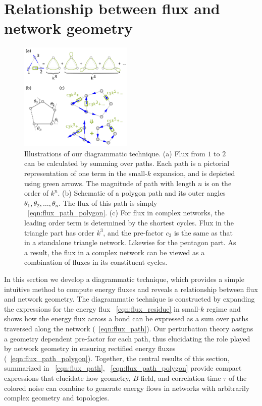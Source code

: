 \documentclass[
 preprint,
 preprintnumbers,
 amsmath,amssymb,
 aps,
 pre,
 longbibliography,
 superscriptaddress,
 10pt, twocolumn
]{revtex4-1}
\begin{document}
\section{Relationship between flux and network geometry} \label{sec:path}
\begin{figure}[ht]
	\centering
	\includegraphics[width=0.48\textwidth]{path_sum.pdf}
    \caption{Illustrations of our diagrammatic technique.
    (a) Flux from $1$ to $2$ can be calculated by summing over paths. Each path is a pictorial representation of one term in the small-$k$ expansion, and is depicted using green arrows. The magnitude of path with length $n$ is on the order of $k^n$.
    (b) Schematic of a polygon path and its outer angles $\theta_1,\theta_2,\dots,\theta_n$. The flux of this path is simply \eqnname~\eqref{eqn:flux_path_polygon}.
    (c) For flux in complex networks, the leading order term is determined by the shortest cycles. Flux in the triangle part has order $k^3$, and the pre-factor $c_3$ is the same as that in a standalone triangle network. Likewise for the pentagon part. As a result, the flux in a complex network can be viewed as a combination of fluxes in its constituent cycles.
    }
    \label{fig:path_sum}
\end{figure}

In this section we develop a diagrammatic technique, which provides a simple intuitive method to compute energy fluxes and reveals a relationship between flux and network geometry.
The diagrammatic technique is constructed by expanding the expressions for the energy flux \eqnname~\eqref{eqn:flux_residue} in small-$k$ regime and shows how the energy flux across a bond can be expressed as a sum over paths traversed along the network (\eqnname~\eqref{eqn:flux_path}). Our perturbation theory assigns a geometry dependent pre-factor for each path, thus elucidating the role played by network geometry in ensuring rectified energy fluxes (\eqnname~\eqref{eqn:flux_path_polygon}). Together, the central results of this section, summarized in  \eqnname~\ref{eqn:flux_path}, \eqnname~\ref{eqn:flux_path_polygon} provide compact expressions that elucidate how geometry, $B$-field, and correlation time $\tau$ of the colored noise can combine to generate energy flows in networks with arbitrarily complex geometry and topologies.
\end{document}
